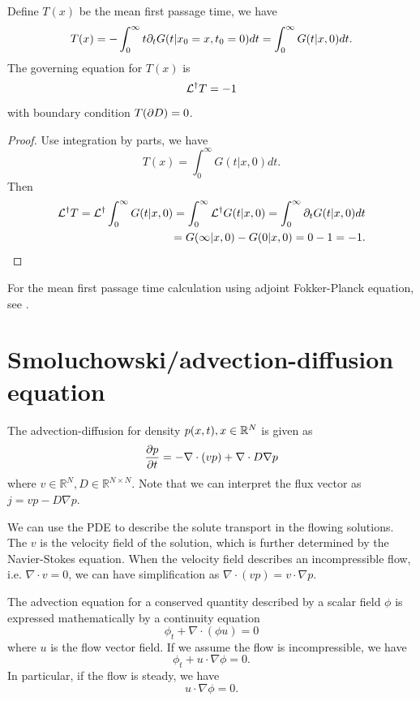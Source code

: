 \begin{refsection}
\begin{lemma}
Define $T(x)$ be the mean first passage time, we have
$$T(x) = -\int_0^\infty t \partial_t G(t|x_0=x,t_0=0) dt = \int_0^\infty G(t|x,0)dt.$$
The governing equation for $T(x)$ is
$$\mathcal{L}^\dagger T = -1$$
with boundary condition $T(\partial D) = 0$.
\end{lemma}
\begin{proof}
Use integration by parts, we have
$$T(x) =  \int_0^\infty G(t|x,0)dt.$$
Then
\begin{align*}
\mathcal{L}^\dagger T = \mathcal{L}^\dagger\int_0^\infty G(t|x,0) = \int_0^\infty \mathcal{L}^\dagger G(t|x,0) = \int_0^\infty \partial_t G(t|x,0) dt \\ = G(\infty|x,0) - G(0|x,0) = 0 - 1 = -1.
\end{align*}
\end{proof}

\begin{remark}
	For the mean first passage time calculation using adjoint Fokker-Planck equation, see \cite{liu2016adjoint}.
\end{remark}

\section{Smoluchowski/advection-diffusion equation}
\begin{definition}
	The advection-diffusion for density $p(x,t), x\in \mathbb{R}^N$ is given as $$\frac{\partial p}{\partial t} = -\nabla \cdot (vp) + \nabla\cdot D\nabla p$$
	where $v\in \mathbb{R}^N,D\in \mathbb{R}^{N\times N}$. Note that we can interpret the flux vector as $j = vp-D\nabla p$.
\end{definition}

\begin{remark}
	We can use the PDE to describe the solute transport in the flowing solutions. The $v$ is the velocity field of the solution, which is further determined by the Navier-Stokes equation. When the velocity field describes an incompressible flow, i.e. $\nabla \cdot v = 0$, we can have simplification as $\nabla \cdot (vp) = v\cdot \nabla p$.	
\end{remark}

\begin{remark}
	
\end{remark}
The advection equation for a conserved quantity described by a scalar field $\phi$ is expressed mathematically by a continuity equation $$\phi_t + \nabla \cdot (\phi u) =0$$where $u$ is the flow vector field. If we assume the flow is incompressible, we have $$\phi_t + u \cdot \nabla \phi = 0. $$
In particular, if the flow is steady, we have $$u\cdot \nabla \phi = 0.$$


\end{refsection}
